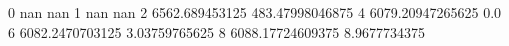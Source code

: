 0 nan nan
1 nan nan
2 6562.689453125 483.47998046875
4 6079.20947265625 0.0
6 6082.2470703125 3.03759765625
8 6088.17724609375 8.9677734375
